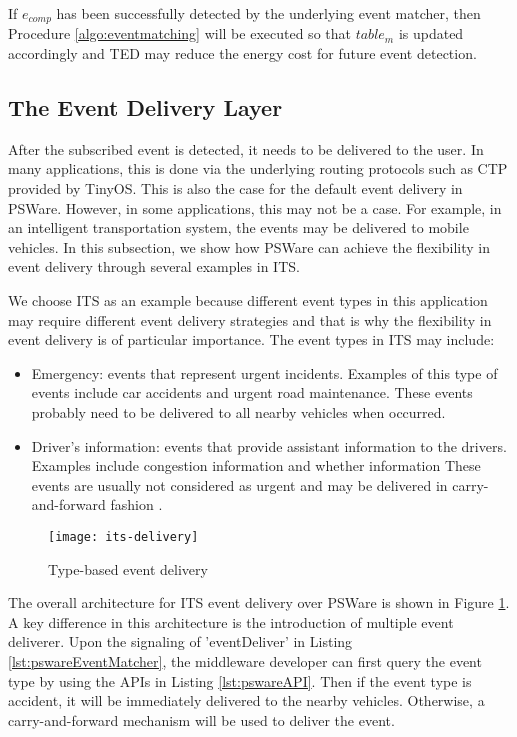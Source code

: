 If \(e_{comp}\) has been successfully detected by the underlying event matcher, then Procedure \ref{algo:eventmatching} will be executed so that \(table_m\) is updated accordingly and TED may reduce the energy cost for future event detection.

\subsection{The Event Delivery Layer}
After the subscribed event is detected, it needs to be delivered to the user. In many applications, this is done via the underlying routing protocols such as CTP provided by TinyOS. This is also the case for the default event delivery in PSWare. However, in some applications, this may not be a case. For example, in an intelligent transportation system, the events may be delivered to mobile vehicles. In this subsection, we show how PSWare can achieve the flexibility in event delivery through several examples in ITS.

We choose ITS as an example because different event types in this application may require different event delivery strategies and that is why the flexibility in event delivery is of particular importance. The event types in ITS may include:
\begin{itemize}
\item Emergency: events that represent urgent incidents. Examples of this type of events include car accidents and urgent road maintenance. These events probably need to be delivered to all nearby vehicles when occurred.
\item Driver's information: events that provide assistant information to the drivers. Examples include congestion information and whether information These events are usually not considered as urgent and may be delivered in carry-and-forward fashion \cite{cartel}.
\end{itemize}

\begin{figure}
\centering
\texttt{[image: its-delivery]}
\caption{Type-based event delivery}
\label{fig:its-delivery}
\end{figure}

The overall architecture for ITS event delivery over PSWare is shown in Figure \ref{fig:its-delivery}. A key difference in this architecture is the introduction of multiple event deliverer. Upon the signaling of 'eventDeliver' in Listing \ref{lst:pswareEventMatcher}, the middleware developer can first query the event type by using the APIs in Listing \ref{lst:pswareAPI}. Then if the event type is accident, it will be immediately delivered to the nearby vehicles. Otherwise, a carry-and-forward mechanism will be used to deliver the event.


